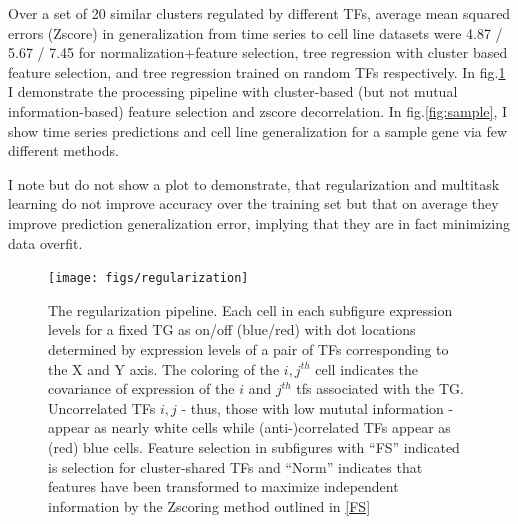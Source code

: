 \documentclass[12pt,a4paper]{article}
\begin{document}
\begin{multicols}{2}
Over a set of 20 similar clusters regulated by different TFs, average mean squared errors (Zscore) in generalization from time series to cell line datasets were 4.87 / 5.67  / 7.45 for normalization+feature selection, tree regression with cluster based feature selection, and tree regression trained on random TFs respectively. In fig.\ref{fig:reg} I demonstrate the processing pipeline with cluster-based (but not mutual information-based) feature selection and zscore decorrelation. In fig.\ref{fig:sample}, I show time series predictions and cell line generalization for a sample gene via few different methods. 

I note but do not show a plot to demonstrate, that regularization and multitask learning do not improve accuracy over the  training set but that on average they improve prediction generalization error, implying that they are in fact minimizing data overfit.

\begin{figure}[h]
\texttt{[image: figs/regularization]}
\caption{The regularization pipeline. Each cell in each subfigure expression levels for a fixed TG as on/off (blue/red) with dot locations determined by expression levels of a pair of TFs corresponding to the X and Y axis. The coloring of the $i,j^{th}$ cell indicates the covariance of expression of the $i$ and $j^{th}$ tfs associated with the TG. Uncorrelated TFs $i,j$ - thus, those with low mututal information - appear as nearly white cells while (anti-)correlated TFs appear as (red) blue cells. Feature selection in subfigures with ``FS'' indicated is selection for cluster-shared TFs and ``Norm'' indicates that features have been transformed to maximize independent information by the Zscoring method outlined in \ref{FS} }
\label{fig:reg}
\end{figure} 



\end{multicols}
\end{document}
